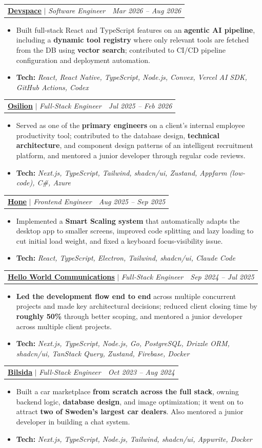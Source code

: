 \documentclass[letterpaper,10pt]{article}
\makeatletter
\newcommand{\resumeItem}[1]{
  \item\small{
    {#1 \vspace{-2pt}}
  }
}
\newcommand{\resumeSubheading}[3]{
  \vspace{-2pt}\item
    \begin{tabular*}{1.0\textwidth}[t]{l@{\extracolsep{\fill}}r}
      \textbf{#1} $|$ \textit{\small #2} & \textit{\small #3} \\
    \end{tabular*}\vspace{-4pt}
}
\newcommand{\resumeItemListStart}{\begin{itemize}[itemsep=1pt,parsep=0pt,topsep=3pt]}
\newcommand{\resumeItemListEnd}{\end{itemize}\vspace{1pt}}
\newcommand{\lnk}[2]{\href{#1}{\underline{#2}}}
\newcommand{\tech}[1]{\resumeItem{\textbf{Tech:} \emph{#1}}}
\makeatother
\begin{document}
    \resumeSubheading
      {\lnk{https://www.devspace.so/}{Devspace}}{Software Engineer}{Mar 2026 -- Aug 2026}
      \resumeItemListStart
        \resumeItem{Built full-stack React and TypeScript features on an \textbf{agentic AI pipeline}, including a \textbf{dynamic tool registry} where only relevant tools are fetched from the DB using \textbf{vector search}; contributed to CI/CD pipeline configuration and deployment automation.}
        \tech{React, React Native, TypeScript, Node.js, Convex, Vercel AI SDK, GitHub Actions, Codex}
      \resumeItemListEnd

    \resumeSubheading
      {\lnk{https://osilion.no/}{Osilion}}{Full-Stack Engineer}{Jul 2025 -- Feb 2026}
      \resumeItemListStart
        \resumeItem{Served as one of the \textbf{primary engineers} on a client's internal employee productivity tool; contributed to the database design, \textbf{technical architecture}, and component design patterns of an intelligent recruitment platform, and mentored a junior developer through regular code reviews.}
        \tech{Next.js, TypeScript, Tailwind, shadcn/ui, Zustand, Appfarm (low-code), C\#, Azure}
      \resumeItemListEnd

    \resumeSubheading
      {\lnk{https://hone.gg/}{Hone}}{Frontend Engineer}{Aug 2025 -- Sep 2025}
      \resumeItemListStart
        \resumeItem{Implemented a \textbf{Smart Scaling system} that automatically adapts the desktop app to smaller screens, improved code splitting and lazy loading to cut initial load weight, and fixed a keyboard focus-visibility issue.}
        \tech{React, TypeScript, Electron, Tailwind, shadcn/ui, Claude Code}
      \resumeItemListEnd

    \resumeSubheading
      {\lnk{https://software.helloworldbd.com/}{Hello World Communications}}{Full-Stack Engineer}{Sep 2024 -- Jul 2025}
      \resumeItemListStart
        \resumeItem{\textbf{Led the development flow end to end} across multiple concurrent projects and made key architectural decisions; reduced client closing time by \textbf{roughly 50\%} through better scoping, and mentored a junior developer across multiple client projects.}
        \tech{Next.js, TypeScript, Node.js, Go, PostgreSQL, Drizzle ORM, shadcn/ui, TanStack Query, Zustand, Firebase, Docker}
      \resumeItemListEnd

    \resumeSubheading
      {\underline{Bilsida}{}}{Full-Stack Engineer}{Oct 2023 -- Aug 2024}
      \resumeItemListStart
        \resumeItem{Built a car marketplace \textbf{from scratch across the full stack}, owning backend logic, \textbf{database design}, and image optimization; it went on to attract \textbf{two of Sweden's largest car dealers}. Also mentored a junior developer in building a chat system.}
        \tech{Next.js, TypeScript, Node.js, Tailwind, shadcn/ui, Appwrite, Docker}
      \resumeItemListEnd
\end{document}
